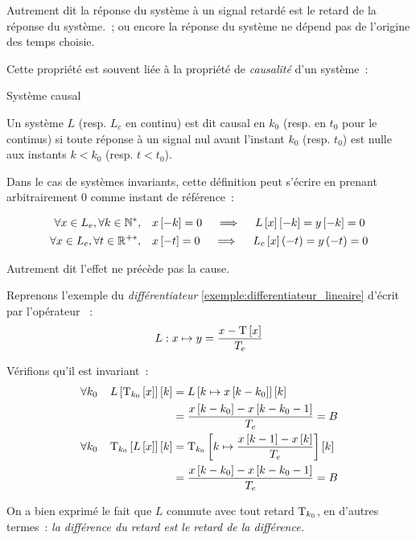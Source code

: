 Autrement dit \og{}la réponse du système à un signal retardé est le
retard de la réponse du système.\fg{}~; ou encore \og{} la réponse du
système ne dépend pas de l'origine des temps choisie.\fg{}

Cette propriété est souvent liée à la propriété de \emph{causalité}
d'un système~:
\begin{definition}{Système causal}
  
  Un système $L$ (resp. $L_c$ en continu) est dit causal en $k_0$
  (resp. en $t_0$ pour le continus) si toute réponse à un signal nul
  avant l'instant $k_0$ (resp. $t_0$) est nulle aux instants $k<k_0$
  (resp. $t<t_0$).

  Dans le cas de systèmes invariants, cette définition peut s'écrire
  en prenant arbitrairement $0$ comme instant de référence~:

  \begin{align}
    \label{eq:systeme_causal}    
    \forall x\in L_e, \forall k\in\mathbb{N}^*, \quad &x\left[-k\right]=0 \quad \implies \quad L\left[x\right]\left[-k\right]=y\left[-k\right]=0 \\
    \forall x\in L_c, \forall t\in\mathbb{R}^{+*}, \quad &x\left[-t\right]=0 \quad \implies \quad L_c\left[x\right]\left(-t\right)=y\left(-t\right)=0   
  \end{align}
\end{definition}

Autrement dit \og{}l'effet ne précède pas la cause.\fg{}
\begin{exemple}
  Reprenons l'exemple du \emph{différentiateur} \ref{exemple:differentiateur_lineaire} d'écrit par l'opérateur ~: $$L : x \mapsto y=\frac{x-\mathrm{T}\left[x\right]}{T_e}$$
  
  Vérifions qu'il est invariant~:
  \begin{eqnarray*}
    \forall k_0 \;\;\;\; L\left[\mathrm{T}_{k_0}\left[x\right]\right]\left[k\right] &= L\left[k\mapsto x\left[k-k_0\right]\right]\left[k\right]\\
                                                   &= \frac{x\left[k-k_0\right]-x\left[k-k_0-1\right]}{T_e} = B\\
    \forall k_0 \;\;\;\; \mathrm{T}_{k_0}\left[L\left[x\right]\right]\left[k\right] &= \mathrm{T}_{k_0}\left[k\mapsto \frac{x\left[k-1\right]-x\left[k\right]}{T_e}\right]\left[k\right]\\
                                                   &= \frac{x\left[k-k_0\right]-x\left[k-k_0-1\right]}{T_e} = B
  \end{eqnarray*}
  
  On a bien exprimé le fait que $L$ commute avec tout retard
  $\mathrm{T}_{k_0}$, en d'autres termes~: \emph{la différence du retard est le retard de la différence.}
\end{exemple}


